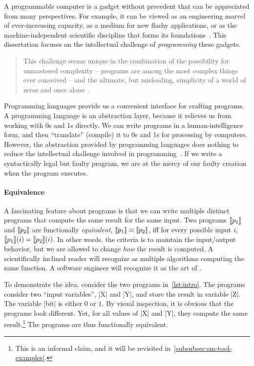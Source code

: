 A programmable computer is a gadget without precedent that can be appreciated
from many perspectives. For example, it can be viewed as an engineering marvel
of ever-increasing capacity, as a medium for new flashy applications, or as the
machine-independent scientific discipline that forms its
foundations~\cite{dijkstra1979a,hoare2006}. This dissertation focuses on the
intellectual challenge of \emph{programming} these gadgets.

\begin{quotation}
\noindent This challenge seems unique in the combination of the possibility for
unmastered complexity -- programs are among the most complex things ever
conceived -- and the ultimate, but misleading, simplicity of a world of zeros
and ones alone~\cite{dijkstra1979a}.
\end{quotation}

Programming languages provide us a convenient interface for crafting programs. A
programming language is an {abstraction layer}, because it relieves us from
working with 0s and 1s directly. We can write programs in a human-intelligence
form, and then \enquote{translate} (compile) it to 0s and 1s for processing by
computers. However, the abstraction provided by programming languages does
nothing to reduce the intellectual challenge involved in
programming~\cite{dijkstra1979b}. If we write a syntactically legal but faulty
program, we are at the mercy of our faulty creation when the program executes.

\paragraph*{Equivalence}
A fascinating feature about programs is that we can write multiple distinct
programs that compute the same result for the same input. Two programs
$\llbracket p_1\rrbracket$ and $\llbracket p_2\rrbracket$ are functionally
\emph{equivalent}, \ie \(\llbracket p_1\rrbracket \equiv
\llbracket p_2\rrbracket\), iff for every possible input \(i\), \(\llbracket p_1\rrbracket(i) =
\llbracket p_2\rrbracket(i)\). In other words, the criteria is to maintain the
input/output behavior, but we are allowed to change \emph{how} the result is
computed. A scientifically inclined reader will recognize  as multiple algorithms computing the same function. A software
engineer will recognize it as the art of .

To demonstrate the idea, consider the two programs in~\autoref{lst:intro}. The
programs consider two \enquote{input variables}, \pr|X| and \pr|Y|, and store
the result in variable \pr|Z|. The variable \pr|bit| is either \(0\) or \(1\).
By visual inspection, it is obvious that the programs look different. Yet, for
all values of \pr|X| and \pr|Y|, they compute the same result.\footnote{This is
an informal claim, and it will be revisited
in~\autoref{subsubsec:sm-tool-examples}.} The programs are thus functionally
equivalent.

